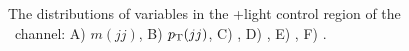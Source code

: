\begin{figure}[htbp]
{    
  }
  \caption[\bosZ+light Control Region Distributions for the \ZnnH\ Channel]{The distributions of variables in the \bosZ+light control region of the \ZnnH\ channel: A) $m(jj)$, B) $p_{\mathrm{T}}(jj)$, C) \btagmax, D) \btagmin, E) \pTjmax, F) \pTjmin.}
  \label{fig:CR_Znn_ZLF_1}
\end{figure}

\clearpage

